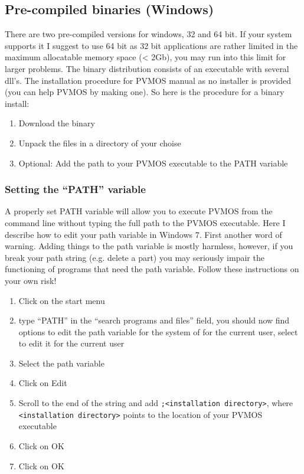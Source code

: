 \documentclass[noshowpacs,preprintnumbers,amsmath,amssymb, letter]{revtex4}
\begin{document}
\subsection{Pre-compiled binaries (Windows)}
There are two pre-compiled versions for windows, 32 and 64 bit. If your system supports it I suggest to use 64 bit as 32 bit applications are rather limited in the maximum allocatable memory space (< 2Gb), you may run into this limit for larger problems. The binary distribution consists of an executable with several dll's. The installation procedure for PVMOS manual as no installer is provided (you can help PVMOS by making one). So here is the procedure for a binary install:
\begin{enumerate}
\item{} Download the binary 
\item{} Unpack the files in a directory of your choise
\item{} Optional: Add the path to your PVMOS executable to the PATH variable
\end{enumerate}

\subsubsection{Setting the ``PATH'' variable}
A properly set PATH variable will allow you to execute PVMOS from the command line without typing the full path to the PVMOS executable. Here I describe how to edit your path variable in Windows 7. First another word of warning. Adding things to the path variable is mostly harmless, however, if you break your path string (e.g. delete a part) you may seriously impair the functioning of programs that need the path variable. Follow these instructions on your own risk!
\begin{enumerate}
\item{} Click on the start menu 
\item{} type ``PATH'' in the ``search programs and files'' field, you should now find options to edit the path variable for the system of for the current user, select to edit it for the current user
\item{} Select the path variable
\item{} Click on Edit
\item{} Scroll to the end of the string and add \texttt{;<installation directory>}, where \texttt{<installation directory>} points to the location of your PVMOS executable
\item{} Click on OK
\item{} Click on OK
\end{enumerate}
\end{document}
